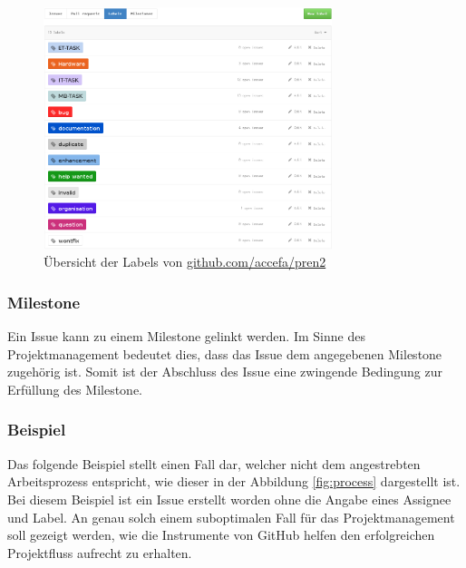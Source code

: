 \begin{figure}[h!]
	\centering
	\includegraphics[width=0.75\textwidth]{../../fig/github/labels.png}
	\caption{Übersicht der Labels von \url{github.com/accefa/pren2}}
	\label{fig:labels}
\end{figure}

\subsubsection{Milestone}
Ein \gls{Issue} kann zu einem \gls{Milestone} gelinkt werden. Im Sinne des
Projektmanagement bedeutet dies, dass das \gls{Issue} dem angegebenen
\gls{Milestone} zugehörig ist. Somit ist der Abschluss des \gls{Issue}
eine zwingende Bedingung zur Erfüllung des \gls{Milestone}.

\clearpage
\subsubsection{Beispiel}
Das folgende Beispiel stellt einen Fall dar, welcher nicht dem angestrebten
Arbeitsprozess entspricht, wie dieser in der Abbildung \ref{fig:process}
dargestellt ist. Bei diesem Beispiel ist ein \gls{Issue} erstellt worden ohne
die Angabe eines \gls{Assignee} und \gls{Label}. An genau solch einem
suboptimalen Fall für das Projektmanagement soll gezeigt werden, wie die
Instrumente von GitHub helfen den erfolgreichen Projektfluss aufrecht zu
erhalten. 

